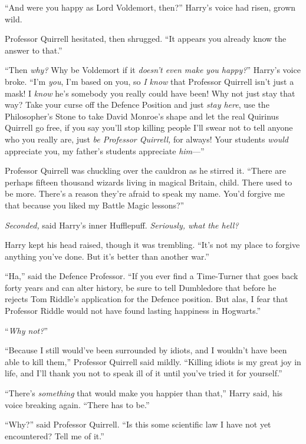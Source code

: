 “And were you happy as Lord Voldemort, then?” Harry’s voice had risen, grown wild.

Professor Quirrell hesitated, then shrugged. “It appears you already know the answer to that.”

“Then \emph{why?} Why be Voldemort if it \emph{doesn’t even make you happy?}” Harry’s voice broke. “I’m \emph{you}, I’m based on you, so \emph{I know} that Professor Quirrell isn’t just a mask! I \emph{know} he’s somebody you really could have been! Why not just stay that way? Take your curse off the Defence Position and just \emph{stay here}, use the Philosopher’s Stone to take David Monroe’s shape and let the real Quirinus Quirrell go free, if you say you’ll stop killing people I’ll swear not to tell anyone who you really are, just \emph{be Professor Quirrell,} for always! Your students \emph{would} appreciate you, my father’s students appreciate \emph{him}—”

Professor Quirrell was chuckling over the cauldron as he stirred it. “There are perhaps fifteen thousand wizards living in magical Britain, child. There used to be more. There’s a reason they’re afraid to speak my name. You’d forgive me that because you liked my Battle Magic lessons?”

\emph{Seconded,} said Harry’s inner Hufflepuff. \emph{Seriously, what the hell?}

Harry kept his head raised, though it was trembling. “It’s not my place to forgive anything you’ve done. But it’s better than another war.”

“Ha,” said the Defence Professor. “If you ever find a Time-Turner that goes back forty years and can alter history, be sure to tell Dumbledore that before he rejects Tom Riddle’s application for the Defence position. But alas, I fear that Professor Riddle would not have found lasting happiness in Hogwarts.”

“\emph{Why not?}”

“Because I still would’ve been surrounded by idiots, and I wouldn’t have been able to kill them,” Professor Quirrell said mildly. “Killing idiots is my great joy in life, and I’ll thank you not to speak ill of it until you’ve tried it for yourself.”

“There’s \emph{something} that would make you happier than that,” Harry said, his voice breaking again. “There has to be.”

“Why?” said Professor Quirrell. “Is this some scientific law I have not yet encountered? Tell me of it.”

